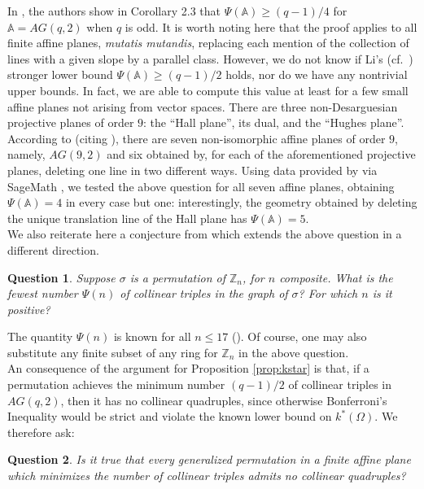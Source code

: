 \documentclass[12pt]{article}
\newtheorem{question}{Question}
\begin{document}
In \cite{cooper}, the authors show in Corollary 2.3 that $\Psi(\mathbb{A}) \geq (q-1)/4$ for $\mathbb{A} = AG(q,2)$ when $q$ is odd.  It is worth noting here that the proof applies to all finite affine planes, {\em mutatis mutandis}, replacing each mention of the collection of lines with a given slope by a parallel class.  However, we do not know if Li's (cf.~\cite{li}) stronger lower bound $\Psi(\mathbb{A}) \geq (q-1)/2$ holds, nor do we have any nontrivial upper bounds.  In fact, we are able to compute this value at least for a few small affine planes not arising from vector spaces.  There are three non-Desarguesian projective planes of order $9$: the ``Hall plane'', its dual, and the ``Hughes plane''.  According to \cite{hurkens} (citing \cite{kamber}), there are seven non-isomorphic affine planes of order $9$, namely, $AG(9,2)$ and six obtained by, for each of the aforementioned projective planes, deleting one line in two different ways. Using data provided by \cite{moore} via SageMath \cite{sage}, we tested the above question for all seven affine planes, obtaining $\Psi(\mathbb{A})=4$ in every case but one: interestingly, the geometry obtained by deleting the unique translation line of the Hall plane has $\Psi(\mathbb{A})=5$.\\

We also reiterate here a conjecture from \cite{cooper} which extends the above question in a different direction.

\begin{question}
    Suppose $\sigma$ is a permutation of $\mathbb{Z}_n$, for $n$ composite.  What is the fewest number $\Psi(n)$ of collinear triples in the graph of $\sigma$?  For which $n$ is it positive?
\end{question}

The quantity $\Psi(n)$ is known for all $n \leq 17$ (\cite[A379299]{oeis}).  Of course, one may also substitute any finite subset of any ring for $\mathbb{Z}_n$ in the above question. \\

An consequence of the argument for Proposition \ref{prop:kstar} is that, if a permutation achieves the minimum number $(q-1)/2$ of collinear triples in $AG(q,2)$, then it has no collinear quadruples, since otherwise Bonferroni's Inequality would be strict and violate the known lower bound on $k^*(\Omega)$.  We therefore ask:

\begin{question}
    Is it true that every generalized permutation in a finite affine plane which minimizes the number of collinear triples admits no collinear quadruples?
\end{question}

{}

 
\end{document}
